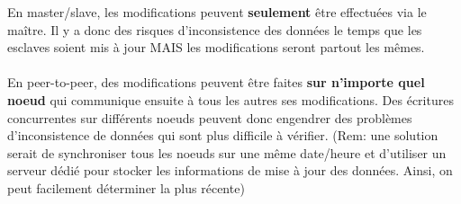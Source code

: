 \item{}
{\faux}
{En master/slave, les modifications peuvent \textbf{seulement} être effectuées via le maître. Il y a donc des risques d'inconsistence des données le temps que les esclaves soient mis à jour MAIS les modifications seront partout les mêmes.
\paragraph{}
En peer-to-peer, des modifications peuvent être faites \textbf{sur n'importe quel noeud} qui communique ensuite à tous les autres ses modifications. Des écritures concurrentes sur différents noeuds peuvent donc engendrer des problèmes d'inconsistence de données qui sont plus difficile à vérifier. (Rem: une solution serait de synchroniser tous les noeuds sur une même date/heure et d'utiliser un serveur dédié pour stocker les informations de mise à jour des données. Ainsi, on peut facilement déterminer la plus récente)
}
